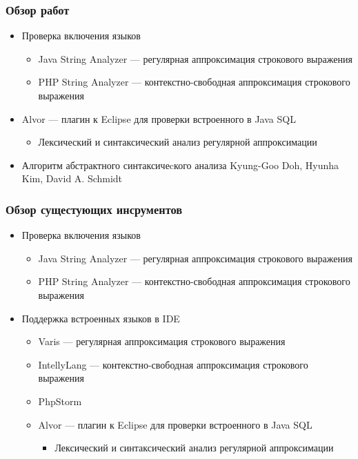 \documentclass{beamer}
\begin{document}
\begin{frame}
    \transwipe[direction=90]
    \frametitle{Обзор работ}
    \begin{itemize}
        \item Проверка включения языков 
        \begin{itemize}
            \item Java String Analyzer --- регулярная аппроксимация строкового выражения
            \item PHP String Analyzer --- контекстно-свободная аппроксимация строкового выражения
        \end{itemize}
        \item Alvor --- плагин к Eclipse для проверки встроенного в Java SQL 
        \begin{itemize}
            \item Лексический и синтаксический анализ регулярной аппроксимации
        \end{itemize}
        \item Алгоритм абстрактного синтаксичеcкого анализа Kyung-Goo Doh, Hyunha Kim, 
              David A. Schmidt
    \end{itemize}
\end{frame}

\begin{frame}
    \transwipe[direction=90]
    \frametitle{Обзор сущестующих инсрументов}
    \begin{itemize}
        \item Проверка включения языков 
        \begin{itemize}
            \item Java String Analyzer --- регулярная аппроксимация строкового выражения
            \item PHP String Analyzer --- контекстно-свободная аппроксимация строкового выражения
        \end{itemize}
        \item Поддержка встроенных языков в IDE
        \begin{itemize}
            \item Varis --- регулярная аппроксимация строкового выражения
            \item IntellyLang --- контекстно-свободная аппроксимация строкового выражения
            \item PhpStorm
            \item Alvor --- плагин к Eclipse для проверки встроенного в Java SQL 
            \begin{itemize}
              \item Лексический и синтаксический анализ регулярной аппроксимации
            \end{itemize}
        \end{itemize}        
    \end{itemize}
\end{frame}
\end{document}
